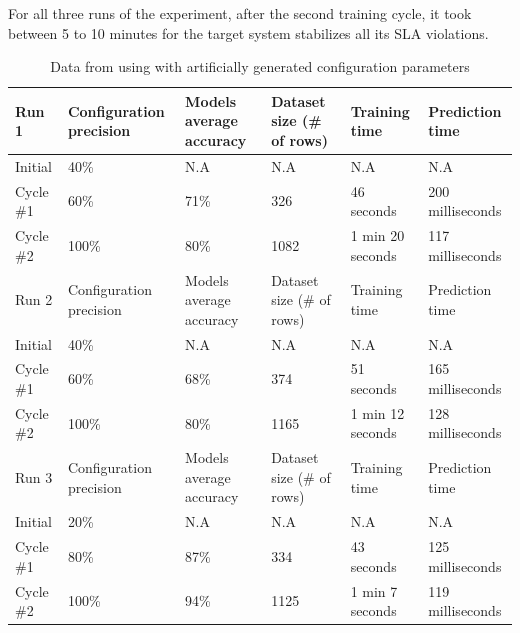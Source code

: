For all three runs of the experiment, after the second training cycle, it took between 5 to 10 minutes for the target system stabilizes all its SLA violations.

\begin{table}[t]
\caption{Data from using \projectname{} with artificially generated configuration parameters}
\label{tab:experiment1}
\begin{tabular}{llllll}
\hline
Run 1     & Configuration precision & Models average accuracy & Dataset size (\# of rows) & Training time    & Prediction time  \\ \hline
Initial   & 40\%                    & N.A                     & N.A                       & N.A              & N.A              \\
Cycle \#1 & 60\%                    & 71\%                    & 326                       & 46 seconds       & 200 milliseconds \\
Cycle \#2 & 100\%                   & 80\%                    & 1082                      & 1 min 20 seconds & 117 milliseconds \\ \hline
Run 2     & Configuration precision & Models average accuracy & Dataset size (\# of rows) & Training time    & Prediction time  \\ \hline
Initial   & 40\%                    & N.A                     & N.A                       & N.A              & N.A              \\
Cycle \#1 & 60\%                    & 68\%                    & 374                       & 51 seconds       & 165 milliseconds \\
Cycle \#2 & 100\%                   & 80\%                    & 1165                      & 1 min 12 seconds & 128 milliseconds \\ \hline
Run 3     & Configuration precision & Models average accuracy & Dataset size (\# of rows) & Training time    & Prediction time  \\ \hline
Initial   & 20\%                    & N.A                     & N.A                       & N.A              & N.A              \\
Cycle \#1 & 80\%                    & 87\%                    & 334                       & 43 seconds       & 125 milliseconds \\
Cycle \#2 & 100\%                   & 94\%                    & 1125                      & 1 min 7 seconds  & 119 milliseconds
\end{tabular}
\end{table}


